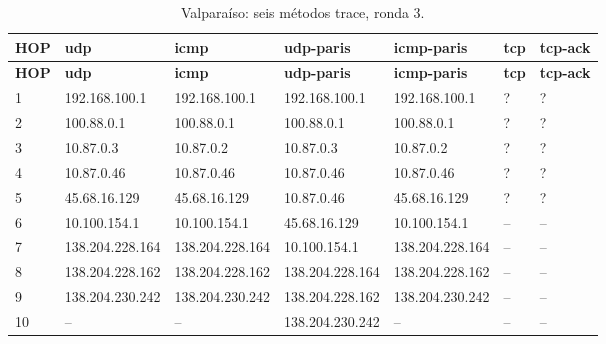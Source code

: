 \begin{landscape}
\begingroup
\fontsize{9}{11}\selectfont
\begin{longtable}{p{0.95cm}p{3.725cm}p{3.725cm}p{3.725cm}p{3.725cm}p{3.725cm}p{3.725cm}}
\caption{Valparaíso: seis métodos trace, ronda 3.}\label{anexo:trace:138.204.230.242:3} \\
\toprule
\textbf{HOP} & \textbf{udp} & \textbf{icmp} & \textbf{udp-paris} & \textbf{icmp-paris} & \textbf{tcp} & \textbf{tcp-ack} \\ \midrule
\endfirsthead
\toprule
\textbf{HOP} & \textbf{udp} & \textbf{icmp} & \textbf{udp-paris} & \textbf{icmp-paris} & \textbf{tcp} & \textbf{tcp-ack} \\ \midrule
\endhead
1 & 192.168.100.1 & 192.168.100.1 & 192.168.100.1 & 192.168.100.1 & ? & ? \\
2 & 100.88.0.1 & 100.88.0.1 & 100.88.0.1 & 100.88.0.1 & ? & ? \\
3 & 10.87.0.3 & 10.87.0.2 & 10.87.0.3 & 10.87.0.2 & ? & ? \\
4 & 10.87.0.46 & 10.87.0.46 & 10.87.0.46 & 10.87.0.46 & ? & ? \\
5 & 45.68.16.129 & 45.68.16.129 & 10.87.0.46 & 45.68.16.129 & ? & ? \\
6 & 10.100.154.1 & 10.100.154.1 & 45.68.16.129 & 10.100.154.1 & -- & -- \\
7 & 138.204.228.164 & 138.204.228.164 & 10.100.154.1 & 138.204.228.164 & -- & -- \\
8 & 138.204.228.162 & 138.204.228.162 & 138.204.228.164 & 138.204.228.162 & -- & -- \\
9 & 138.204.230.242 & 138.204.230.242 & 138.204.228.162 & 138.204.230.242 & -- & -- \\
10 & -- & -- & 138.204.230.242 & -- & -- & -- \\
\bottomrule
\end{longtable}
\endgroup
\end{landscape}
\begingroup
\fontsize{9}{11}\selectfont

